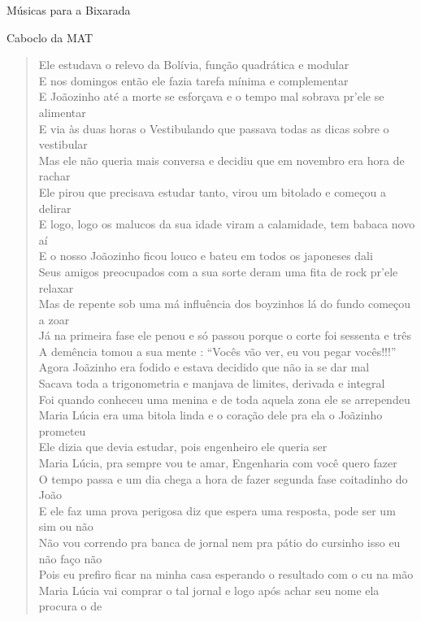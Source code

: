 \begin{secao}{Músicas para a Bixarada}
\begin{subsecao}{Caboclo da MAT}
\begin{verse}
Ele estudava o relevo da Bolívia, função quadrática e modular\\
E nos domingos então ele fazia tarefa mínima e complementar\\
E Joãozinho até a morte se esforçava e o tempo mal sobrava pr'ele se alimentar\\
E via às duas horas o Vestibulando que passava todas as dicas sobre o vestibular\\
Mas ele não queria mais conversa e decidiu que em novembro era hora de rachar\\
Ele pirou que precisava estudar tanto, virou um bitolado e começou a delirar\\
E logo, logo os malucos da sua idade viram a calamidade, tem babaca novo aí\\
E o nosso Joãozinho ficou louco e bateu em todos os japoneses dali\\
Seus amigos preocupados com a sua sorte deram uma fita de rock pr'ele relaxar\\
Mas de repente sob uma má influência dos boyzinhos lá do fundo começou a zoar\\
Já na primeira fase ele penou e só passou porque o corte foi sessenta e três\\
A demência tomou a sua mente : ``Vocês vão ver, eu vou pegar vocês!!!''\\
Agora Joãzinho era fodido e estava decidido que não ia se dar mal\\
Sacava toda a trigonometria e manjava de limites, derivada e integral\\
Foi quando conheceu uma menina e de toda aquela zona ele se arrependeu\\
Maria Lúcia era uma bitola linda e o coração dele pra ela o Joãzinho prometeu\\
Ele dizia que devia estudar, pois engenheiro ele queria ser\\
Maria Lúcia, pra sempre vou te amar, Engenharia com você quero fazer\\
O tempo passa e um dia chega a hora de fazer segunda fase coitadinho do João\\
E ele faz uma prova perigosa diz que espera uma resposta, pode ser um sim ou não\\
Não vou correndo pra banca de jornal nem pra pátio do cursinho isso eu não faço
não\\
Pois eu prefiro ficar na minha casa esperando o resultado com o cu na mão\\
Maria Lúcia vai comprar o tal jornal e logo após achar seu nome ela procura o de

\end{verse}
\end{subsecao}
\end{secao}
